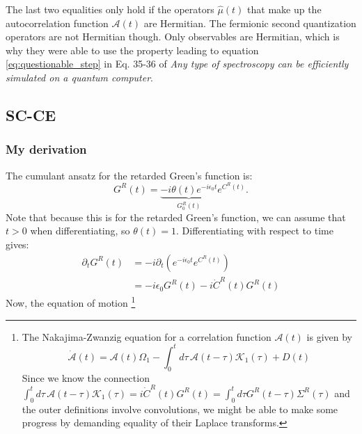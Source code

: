 The last two equalities only hold if the operators $\hat{\mu}(t)$ that make up the autocorrelation function $\mathcal{A}(t)$ are Hermitian. The fermionic second quantization operators are not Hermitian though. Only observables are Hermitian, which is why they were able to use the property leading to equation \eqref{eq:questionable_step} in Eq. 35-36 of \emph{Any type of spectroscopy can be efficiently simulated on a quantum computer}.
\subsection{SC-CE}

\subsubsection{My derivation}
 The cumulant ansatz for the retarded Green's function is:
\begin{equation}
    G^R(t)=\underbrace{-i \theta(t) e^{-i \epsilon_0 t}}_{G_0^R(t)} e^{C^R(t)} .
\end{equation}
Note that because this is for the retarded Green's function, we can assume that $t>0$ when differentiating, so $\theta(t)=1$. 
Differentiating with respect to time gives:
\begin{align}
    \partial_t G^R(t)&=-i\partial_t\left(e^{-i \epsilon_0 t} e^{C^R(t)}\right)\\
    &= -i \epsilon_0 G^R(t) - i \dot{C}^R(t) G^R(t)
\end{align}
 Now, the equation of motion
\footnote{
The Nakajima-Zwanzig equation for a correlation function $\mathcal{A}(t)$ is given by
\begin{equation}
\dot{\mathcal{A}}(t) = \mathcal{A}(t) {\Omega_1} - \int_{0}^{t} d \tau\, \mathcal{A}(t - \tau) \mathcal{K}_1(\tau) + D(t)
\label{eq:GQME}
\end{equation}
Since we know the connection $\int_{0}^{t} d \tau\, \mathcal{A}(t - \tau) \mathcal{K}_1(\tau) = i \dot{C}^R(t) G^R(t) = \int_0^t d \tau G^R(t-\tau) \Sigma^R(\tau)$ and the outer definitions involve convolutions, we might be able to make some progress by demanding equality of their Laplace transforms.}
